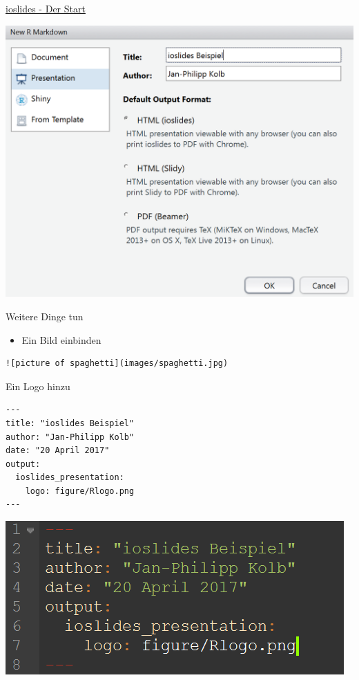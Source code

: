 \documentclass[ignorenonframetext,]{beamer}
\providecommand{\tightlist}{%
\setlength{\itemsep}{0pt}\setlength{\parskip}{0pt}}
\begin{document}
\begin{frame}{\href{http://rmarkdown.rstudio.com/ioslides_presentation_format.html}{ioslides
- Der Start}}

\includegraphics{./tex2pdf.956/7febec5c9b6b0b5ca4f1d8060a7f9b28faff5129.png}

\end{frame}

\begin{frame}[fragile]{Weitere Dinge tun}

\begin{itemize}
\tightlist
\item
  Ein Bild einbinden
\end{itemize}

\begin{verbatim}
![picture of spaghetti](images/spaghetti.jpg)
\end{verbatim}

\end{frame}

\begin{frame}[fragile]{Ein Logo hinzu}

\begin{verbatim}
---
title: "ioslides Beispiel"
author: "Jan-Philipp Kolb"
date: "20 April 2017"
output: 
  ioslides_presentation:
    logo: figure/Rlogo.png
---
\end{verbatim}

\includegraphics{./tex2pdf.956/042adbdef801e8829eea31fc08de0770ac15f26a.png}

\end{frame}
\end{document}
